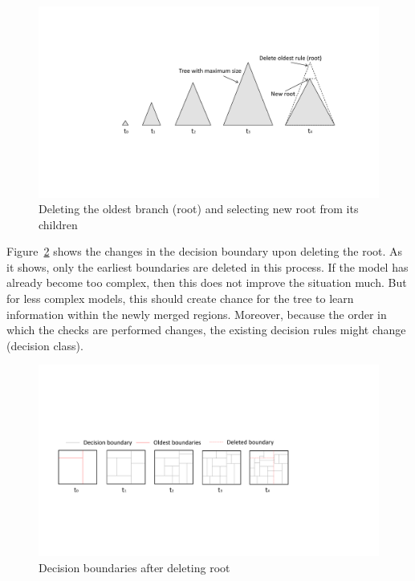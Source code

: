 \begin{figure}[htbp]
    \begin{center}
        \includegraphics[width=14.0cm]{figs/deleteroot.pdf}
        \caption{Deleting the oldest branch (root) and selecting new root from its children}
        \label{fig:algo:delroot}
    \end{center}
\end{figure}

Figure~\ref{fig:algo:delrootdb} shows the changes in the decision boundary upon deleting the root. As it shows, only the earliest boundaries are deleted in this process. If the model has already become too complex, then this does not improve the situation much. But for less complex models, this should create chance for the tree to learn information within the newly merged regions. Moreover, because the order in which the checks are performed changes, the existing decision rules might change (decision class).

\begin{figure}[htbp]
    \begin{center}
        \includegraphics[width=14.0cm]{figs/deleterootdb.pdf}
        \caption{Decision boundaries after deleting root}
        \label{fig:algo:delrootdb}
    \end{center}
\end{figure}


